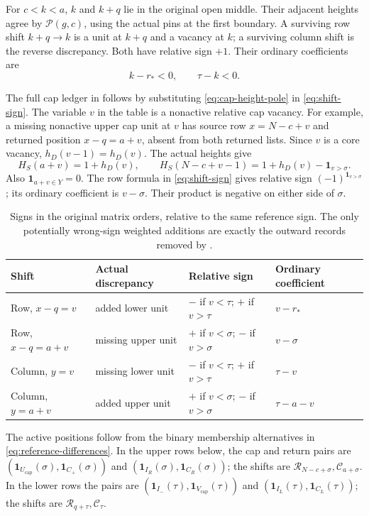 \documentclass[11pt,a4paper]{amsart}
\numberwithin{equation}{section}
\theoremstyle{plain}
\theoremstyle{definition}
\newcommand{\one}{\mathbf1}
\begin{document}
For \(c<k<a\), \(k\) and \(k+q\) lie in the original open middle.  Their adjacent
heights agree by \(\mathcal P(g,c)\), using the actual pins at the first
boundary.  A surviving row shift \(k+q\to k\) is a unit at \(k+q\) and a
vacancy at \(k\); a surviving column shift is the reverse discrepancy.
Both have relative sign \(+1\).  Their ordinary coefficients are
\begin{equation}\label{eq:private-weights}
 k-r_*<0,\qquad \tau-k<0.
\end{equation}

The full cap ledger in  follows by substituting
\eqref{eq:cap-height-pole} in \eqref{eq:shift-sign}.  The variable \(v\) in the table is a nonactive
relative cap vacancy.
For example, a missing nonactive upper cap unit at \(v\) has source
row \(x=N-c+v\) and returned position \(x-q=a+v\), absent from both
returned lists.  Since \(v\) is a core vacancy,
\(h_D(v-1)=h_D(v)\).  The actual heights give
\[
 H_S(a+v)=1+h_D(v),\qquad
 H_S(N-c+v-1)=1+h_D(v)-\one_{v>\sigma}.
\]
Also \(\one_{a+v\in Y}=0\).
The row formula in \eqref{eq:shift-sign} gives relative sign
\((-1)^{\one_{v>\sigma}}\); its ordinary coefficient is
\(v-\sigma\).  Their product is negative on either side of \(\sigma\).
\begin{table}[ht]
\centering\small
\begin{tabular}{@{}llll@{}}
\toprule
Shift & Actual discrepancy & Relative sign & Ordinary coefficient\\
\midrule
Row, \(x-q=v\) & added lower unit & \(-\) if \(v<\tau\); \(+\) if \(v>\tau\) & \(v-r_*\)\\
Row, \(x-q=a+v\) & missing upper unit & \(+\) if \(v<\sigma\); \(-\) if \(v>\sigma\) & \(v-\sigma\)\\
Column, \(y=v\) & missing lower unit & \(-\) if \(v<\tau\); \(+\) if \(v>\tau\) & \(\tau-v\)\\
Column, \(y=a+v\) & added upper unit & \(+\) if \(v<\sigma\); \(-\) if \(v>\sigma\) & \(\tau-a-v\)\\
\bottomrule
\end{tabular}
\par\medskip
\caption{Signs in the original matrix orders, relative to the same
reference sign.  The only potentially wrong-sign weighted additions are
exactly the outward records removed by .}
\label{tab:cap-signs}
\end{table}

The active positions follow from the binary membership alternatives
in \eqref{eq:reference-differences}.  In the upper rows below, the cap
and return pairs are
\((\one_{U_{\mathrm{cap}}}(\sigma),\one_{C_+}(\sigma))\) and
\((\one_{I_R}(\sigma),\one_{C_R}(\sigma))\);
the shifts are \(\mathcal R_{N-c+\sigma},\mathcal C_{a+\sigma}\).
In the lower rows the pairs are
\((\one_{I_-}(\tau),\one_{V_{\mathrm{cap}}}(\tau))\) and
\((\one_{I_L}(\tau),\one_{C_L}(\tau))\);
the shifts are \(\mathcal R_{q+\tau},\mathcal C_\tau\).
\end{document}
